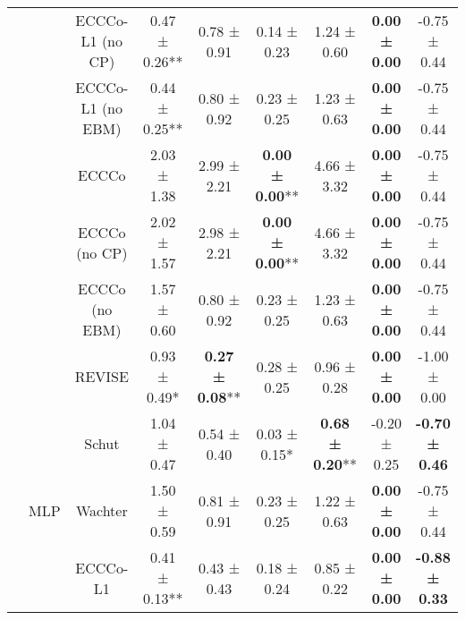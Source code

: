 \begin{longtable}[t]{ccccccccc}
 &  & ECCCo-L1 (no CP) & 0.47 ± 0.26** & 0.78 ± 0.91\hphantom{*}\hphantom{*} & 0.14 ± 0.23\hphantom{*}\hphantom{*} & 1.24 ± 0.60\hphantom{*}\hphantom{*} & \textbf{0.00 ± 0.00}\hphantom{*}\hphantom{*} & -0.75 ± 0.44\hphantom{*}\hphantom{*}\\

 &  & ECCCo-L1 (no EBM) & 0.44 ± 0.25** & 0.80 ± 0.92\hphantom{*}\hphantom{*} & 0.23 ± 0.25\hphantom{*}\hphantom{*} & 1.23 ± 0.63\hphantom{*}\hphantom{*} & \textbf{0.00 ± 0.00}\hphantom{*}\hphantom{*} & -0.75 ± 0.44\hphantom{*}\hphantom{*}\\

 &  & ECCCo & 2.03 ± 1.38\hphantom{*}\hphantom{*} & 2.99 ± 2.21\hphantom{*}\hphantom{*} & \textbf{0.00 ± 0.00}** & 4.66 ± 3.32\hphantom{*}\hphantom{*} & \textbf{0.00 ± 0.00}\hphantom{*}\hphantom{*} & -0.75 ± 0.44\hphantom{*}\hphantom{*}\\

 &  & ECCCo (no CP) & 2.02 ± 1.57\hphantom{*}\hphantom{*} & 2.98 ± 2.21\hphantom{*}\hphantom{*} & \textbf{0.00 ± 0.00}** & 4.66 ± 3.32\hphantom{*}\hphantom{*} & \textbf{0.00 ± 0.00}\hphantom{*}\hphantom{*} & -0.75 ± 0.44\hphantom{*}\hphantom{*}\\

 &  & ECCCo (no EBM) & 1.57 ± 0.60\hphantom{*}\hphantom{*} & 0.80 ± 0.92\hphantom{*}\hphantom{*} & 0.23 ± 0.25\hphantom{*}\hphantom{*} & 1.23 ± 0.63\hphantom{*}\hphantom{*} & \textbf{0.00 ± 0.00}\hphantom{*}\hphantom{*} & -0.75 ± 0.44\hphantom{*}\hphantom{*}\\

 &  & REVISE & 0.93 ± 0.49*\hphantom{*} & \textbf{0.27 ± 0.08}** & 0.28 ± 0.25\hphantom{*}\hphantom{*} & 0.96 ± 0.28\hphantom{*}\hphantom{*} & \textbf{0.00 ± 0.00}\hphantom{*}\hphantom{*} & -1.00 ± 0.00\hphantom{*}\hphantom{*}\\

 &  & Schut & 1.04 ± 0.47\hphantom{*}\hphantom{*} & 0.54 ± 0.40\hphantom{*}\hphantom{*} & 0.03 ± 0.15*\hphantom{*} & \textbf{0.68 ± 0.20}** & -0.20 ± 0.25\hphantom{*}\hphantom{*} & \textbf{-0.70 ± 0.46}\hphantom{*}\hphantom{*}\\

 & \multirow[t]{-9}{*}{\centering\arraybackslash MLP} & Wachter & 1.50 ± 0.59\hphantom{*}\hphantom{*} & 0.81 ± 0.91\hphantom{*}\hphantom{*} & 0.23 ± 0.25\hphantom{*}\hphantom{*} & 1.22 ± 0.63\hphantom{*}\hphantom{*} & \textbf{0.00 ± 0.00}\hphantom{*}\hphantom{*} & -0.75 ± 0.44\hphantom{*}\hphantom{*}\\
\cmidrule{2-9}
 &  & ECCCo-L1 & 0.41 ± 0.13** & 0.43 ± 0.43\hphantom{*}\hphantom{*} & 0.18 ± 0.24\hphantom{*}\hphantom{*} & 0.85 ± 0.22\hphantom{*}\hphantom{*} & \textbf{0.00 ± 0.00}\hphantom{*}\hphantom{*} & \textbf{-0.88 ± 0.33}\hphantom{*}\hphantom{*}\\


\end{longtable}
